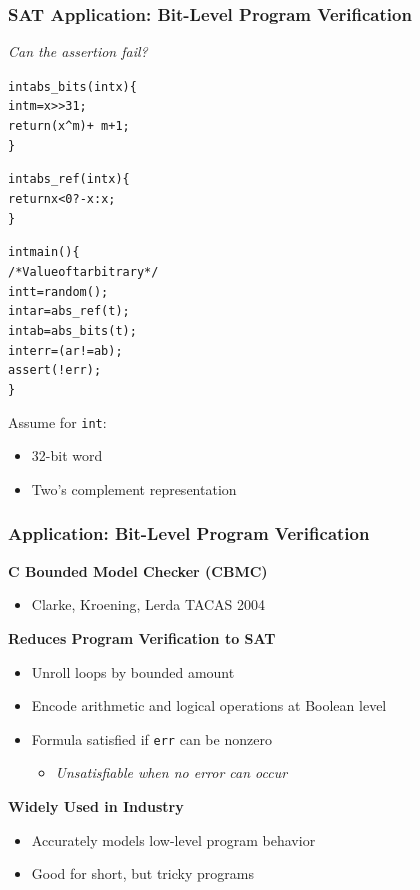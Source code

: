 \documentclass[t,pdf]{beamer}
\newenvironment{ccode}{\begin{alltt}\footnotesize}{\end{alltt}}
\newcommand{\btext}[1]{\textcolor{xblue}{#1}}
\begin{document}
\begin{frame}[fragile]
  \frametitle{SAT Application: Bit-Level Program Verification}
{\large \em \btext{Can the assertion fail?}}\\

\medskip
\begin{minipage}[t]{0.48\textwidth}
\begin{ccode}
int abs_bits(int x) \verb:{:
  int m = x>>31;
  return (x^m) + ~m + 1;
\verb:}:

int abs_ref(int x) \verb:{:
  return x < 0 ? -x : x;
\verb:}:    
\end{ccode}
\end{minipage}
\begin{minipage}[t]{0.48\textwidth}
\begin{ccode}
int main() \verb:{:
  /* Value of t arbitrary */
  int t = random();
  int ar = abs_ref(t);
  int ab = abs_bits(t);
  int err = (ar != ab);
  \btext{assert(!err)};
\verb:}:
\end{ccode}
\end{minipage}

Assume for {\tt int}:
  \begin{itemize}
  \item 32-bit word
  \item Two's complement representation
  \end{itemize}


\end{frame}


\begin{frame}
  \frametitle{Application: Bit-Level Program Verification}
      {\bf C Bounded Model Checker (CBMC)}
      \begin{itemize}
      \item Clarke, Kroening, Lerda  TACAS 2004
      \end{itemize}
\medskip
      {\bf Reduces Program Verification to SAT}
      \begin{itemize}
      \item Unroll loops by bounded amount
      \item Encode arithmetic and logical operations at Boolean level
      \item Formula satisfied if {\tt err} can be nonzero
        \begin{itemize}
          \item {\em Unsatisfiable when no error can occur}
        \end{itemize}
      \end{itemize}
      \medskip
      {\bf Widely Used in Industry}
      \begin{itemize}
      \item Accurately models low-level program behavior
      \item Good for short, but tricky programs
      \end{itemize}

\end{frame}
\end{document}
